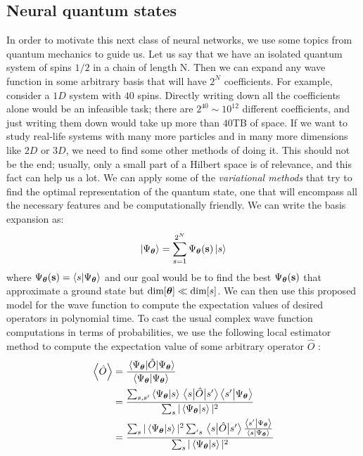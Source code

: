\subsection{Neural quantum states}
In order to motivate this next class of neural networks, we use some topics from quantum mechanics to guide us. Let us say that we have an isolated quantum system of spins $1/2$ in a chain of length N. Then we can expand any wave function in some arbitrary basis that will have $2^N$ coefficients. For example, consider a $1D$ system with $40$ spins. Directly writing down all the coefficients alone would be an infeasible task; there are $2^40 \sim 10^12$ different coefficients, and just writing them down would take up more than $40$TB of space. If we want to study real-life systems with many more particles and in many more dimensions like $2D$ or $3D$, we need to find some other methods of doing it. This should not be the end; usually, only a small part of a Hilbert space is of relevance, and this fact can help us a lot. We can apply some of the \textit{variational methods} that try to find the optimal representation of the quantum state, one that will encompass all the necessary features and be computationally friendly. We can write the basis expansion as:
\begin{equation}
	\ket{\Psi_{\boldsymbol{\theta}}} = \sum_{s=1}^{2^N} \Psi_{\boldsymbol{\theta}}(\vb{s})\ket{s}
\end{equation}
where $\Psi_{\boldsymbol{\theta}}(\vb{s}) = \braket{s}{\Psi_{\boldsymbol{\theta}}}$ and our goal would be to find the best $\Psi_{\boldsymbol{\theta}}(\vb{s})$ that approximate a ground state but $\text{dim}[\boldsymbol{\theta}] \ll \text{dim}[s]$. We can then use this proposed model for the wave function to compute the expectation values of desired operators in polynomial time. To cast the usual complex wave function computations in terms of probabilities, we use the following local estimator method to compute the expectation value of some arbitrary operator $\hat{O}$ \cite{MLintro}:
\begin{equation}
	\begin{split}
		\expval{\hat{O}} &= \frac{\ev{\hat{O}}{\Psi_{\vbtheta}}}{\braket{\Psi_{\vbtheta}}} \\
		&=\frac{\sum_{s,s'} \braket{\Psi_{\vbtheta}}{s} \mel{s}{\hat{O}}{s'}\braket{s'}{\Psi_{\vbtheta}}}{\sum_s |\braket{\Psi_{\vbtheta}}{s}|^2} \\
		&= \frac{\sum_s |\braket{\Psi_{\vbtheta}}{s}|^2 \sum_{'s}\mel{s}{\hat{O}}{s'}\frac{\braket{s'}{\Psi_{\vbtheta}}}{\braket{s}{\Psi_{\vbtheta}}}}{\sum_s |\braket{\Psi_{\vbtheta}}{s}|^2}
	\end{split}
\end{equation}
